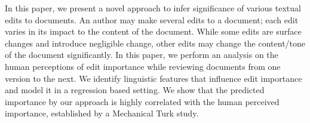 In this paper, we present a novel approach to infer significance of various textual  edits to documents. An author may make several edits to a document; each edit varies in its impact to the content of the document. While some edits are surface changes and introduce negligible change, other edits may change the content/tone of the document significantly. In this paper, we perform an analysis on the human perceptions of edit importance while reviewing documents from one version to the next. We identify linguistic features that influence edit importance and model it in a regression based setting. We show that the predicted importance by our approach is highly correlated with the human perceived importance, established by a Mechanical Turk study.
